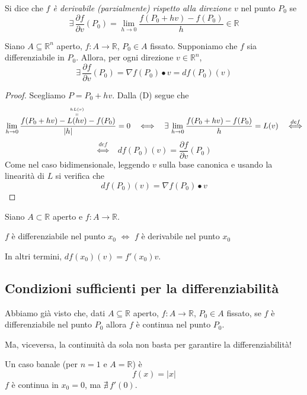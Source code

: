 \begin{definition}
Si dice che \emph{$f$ è derivabile (parzialmente) rispetto alla direzione $v$} nel punto $P_0$ se
$$
\exists \, \frac{\partial f}{\partial v} (P_0)= \lim_{h \rightarrow 0} \frac{f(P_0+hv)-f(P_0)}{h} \in \mathbb{R}
$$
\end{definition}

\begin{proposition}
Siano $A \subseteq \mathbb{R}^n$ aperto, $f: A \longrightarrow \mathbb{R}$, $P_0 \in A$ fissato. Supponiamo che $f$ sia differenziabile in $P_0$. Allora, per ogni direzione $v \in \mathbb{R}^n$,
$$
\exists \, \frac{\partial f}{\partial v} (P_0) = \nabla f(P_0) \bullet v = df(P_0)(v)
$$
\end{proposition}
\begin{proof}
Scegliamo $P=P_0+hv$. Dalla (D) segue che
$$ \lim_{h \rightarrow 0} \frac{f(P_0+hv)-\overset{\overset{hL(v)}{\shortparallel}}{L(hv)}-f(P_0)}{|h|} = 0 \quad \Longleftrightarrow \quad \exists \, \lim_{h \rightarrow 0} \frac{f(P_0+hv)-f(P_0)}{h} = L(v) \quad \overset{def}{\Longleftrightarrow}$$
$$\overset{def}{\Longleftrightarrow} \quad df(P_0)(v) = \frac{\partial f}{\partial v} (P_0)$$
Come nel caso bidimensionale, leggendo $v$ sulla base canonica e usando la linearità di $L$ si verifica che
$$
df(P_0)(v) = \nabla f(P_0) \bullet v
$$
\end{proof}

\begin{obs}[$n=1$]
Siano $A \subset \mathbb{R}$ aperto e $f: A \longrightarrow \mathbb{R}$.
\begin{center}
$f$ è differenziabile nel punto $x_0$ $\Longleftrightarrow$ $f$ è derivabile nel punto $x_0$
\end{center}
In altri termini, $df(x_0)(v) = f'(x_0)v$.
\end{obs}

\subsection{Condizioni sufficienti per la differenziabilità}
Abbiamo già visto che, dati $A \subseteq \mathbb{R}$ aperto, $f:A \longrightarrow \mathbb{R}$, $P_0 \in A$ fissato, se $f$ è differenziabile nel punto $P_0$ allora $f$ è continua nel punto $P_0$.

Ma, viceversa, la continuità da sola non basta per garantire la differenziabilità!

Un caso banale (per $n=1$ e $A = \mathbb{R}$) è
$$f(x) = |x|$$
$f$ è continua in $x_0 = 0$, ma $\nexists \, f'(0)$.

